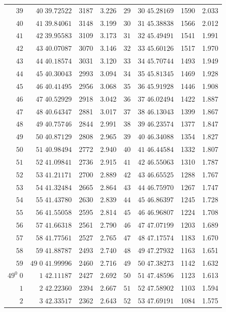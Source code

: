 \begin{center}
\begin{tabular}{|r|r|r|r||r|r|r|r|}
\(39\)&\(40\;39.72522\)&3187&3.226&\(29\)&\(30\;45.28169\)&1590&2.033\\[3pt]
\(40\)&\(41\;39.84061\)&3148&3.199&\(30\)&\(31\;45.38838\)&1566&2.012\\
\(41\)&\(42\;39.95583\)&3109&3.173&\(31\)&\(32\;45.49491\)&1541&1.991\\
\(42\)&\(43\;40.07087\)&3070&3.146&\(32\)&\(33\;45.60126\)&1517&1.970\\
\(43\)&\(44\;40.18574\)&3031&3.120&\(33\)&\(34\;45.70744\)&1493&1.949\\
\(44\)&\(45\;40.30043\)&2993&3.094&\(34\)&\(35\;45.81345\)&1469&1.928\\
\(45\)&\(46\;40.41495\)&2956&3.068&\(35\)&\(36\;45.91928\)&1446&1.908\\
\(46\)&\(47\;40.52929\)&2918&3.042&\(36\)&\(37\;46.02494\)&1422&1.887\\
\(47\)&\(48\;40.64347\)&2881&3.017&\(37\)&\(38\;46.13043\)&1399&1.867\\
\(48\)&\(49\;40.75746\)&2844&2.991&\(38\)&\(39\;46.23574\)&1377&1.847\\
\(49\)&\(50\;40.87129\)&2808&2.965&\(39\)&\(40\;46.34088\)&1354&1.827\\[3pt]
\(50\)&\(51\;40.98494\)&2772&2.940&\(40\)&\(41\;46.44584\)&1332&1.807\\
\(51\)&\(52\;41.09841\)&2736&2.915&\(41\)&\(42\;46.55063\)&1310&1.787\\
\(52\)&\(53\;41.21171\)&2700&2.889&\(42\)&\(43\;46.65525\)&1288&1.767\\
\(53\)&\(54\;41.32484\)&2665&2.864&\(43\)&\(44\;46.75970\)&1267&1.747\\
\(54\)&\(55\;41.43780\)&2630&2.839&\(44\)&\(45\;46.86397\)&1245&1.728\\
\(55\)&\(56\;41.55058\)&2595&2.814&\(45\)&\(46\;46.96807\)&1224&1.708\\
\(56\)&\(57\;41.66318\)&2561&2.790&\(46\)&\(47\;47.07199\)&1203&1.689\\
\(57\)&\(58\;41.77561\)&2527&2.765&\(47\)&\(48\;47.17574\)&1183&1.670\\
\(58\)&\(59\;41.88787\)&2493&2.740&\(48\)&\(49\;47.27932\)&1163&1.651\\
\(59\)&\(49\;0\;41.99996\)&2460&2.716&\(49\)&\(50\;47.38273\)&1142&1.632\\[3pt]
\(49^0\;0\)&\(1\;42.11187\)&2427&2.692&\(50\)&\(51\;47.48596\)&1123&1.613\\
\(1\)&\(2\;42.22360\)&2394&2.667&\(51\)&\(52\;47.58902\)&1103&1.594\\
\(2\)&\(3\;42.33517\)&2362&2.643&\(52\)&\(53\;47.69191\)&1084&1.575\\

\end{tabular}
\end{center}
